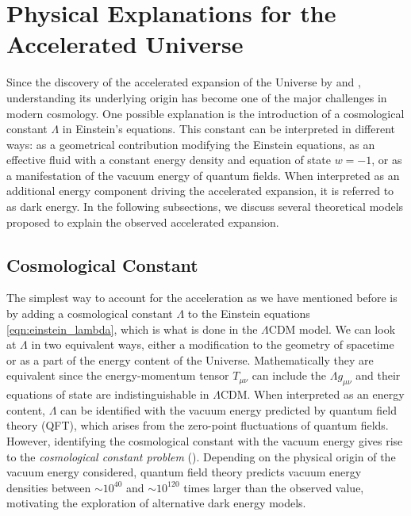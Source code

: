 \section{Physical Explanations for the Accelerated Universe}

Since the discovery of the accelerated expansion of the Universe by 
\cite{Riess_1998} and \cite{Perlmutter_1999}, understanding its underlying origin has 
become one of the major challenges in modern cosmology. One possible explanation is the 
introduction of a cosmological constant $\Lambda$ in Einstein's equations. This constant 
can be interpreted in different ways: as a geometrical contribution modifying the Einstein 
equations, as an effective fluid with a constant energy density and equation of state 
$w=-1$, or as a manifestation of the vacuum energy of quantum fields. When interpreted 
as an additional energy component driving the accelerated expansion, it is referred to as 
dark energy. In the following subsections, we discuss several theoretical models proposed 
to explain the observed accelerated expansion.

\subsection{Cosmological Constant} \label{sec:expanding_universe}

The simplest way to account for the acceleration as we have mentioned before is by adding a cosmological constant $\Lambda$ to the Einstein equations \ref{eqn:einstein_lambda}, 
which is what is done in the $\Lambda$CDM model. We can look at $\Lambda$ in two equivalent ways, either a modification to the geometry of spacetime or as a part of the 
energy content of the Universe. Mathematically they are equivalent since the energy-momentum tensor $T_{\mu \nu}$ can include the $\Lambda g_{\mu \nu}$ and their 
equations of state are indistinguishable in $\Lambda$CDM. 
When interpreted as an energy content, $\Lambda$ can be identified 
with the vacuum energy predicted by quantum field theory 
(QFT), which arises from the zero-point fluctuations of quantum 
fields. However, identifying the cosmological constant with the vacuum energy gives rise to the \textit{cosmological constant problem} (\cite{Weinberg_1989, Carroll_2001}). 
Depending on the physical origin of the vacuum energy considered, quantum field theory predicts vacuum energy densities between $\sim 10^{40}$ and $\sim 10^{120}$ 
times larger than the observed value, motivating the exploration of alternative dark energy models.

